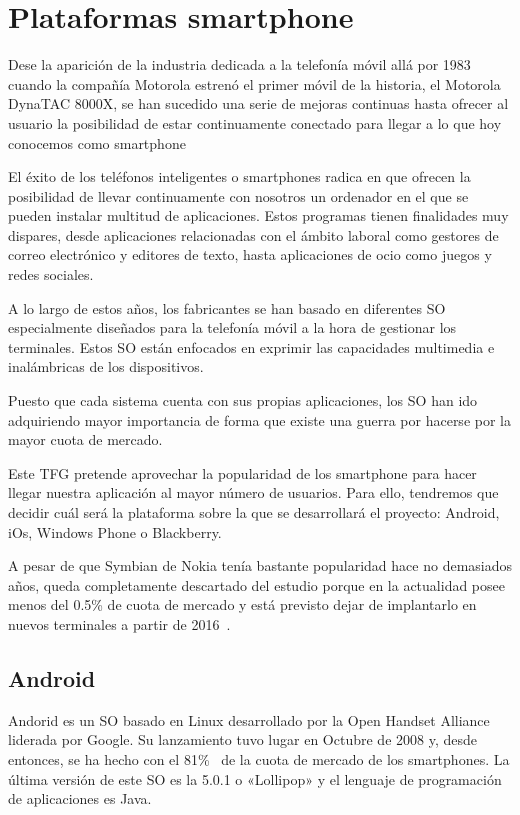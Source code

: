 \section{Plataformas smartphone}

Dese la aparición de la industria dedicada a la telefonía móvil allá por 1983 cuando la compañía
Motorola estrenó el primer móvil de la historia, el Motorola DynaTAC 8000X, se han sucedido una
serie de mejoras continuas hasta ofrecer al usuario la posibilidad de estar continuamente conectado
para llegar a lo que hoy conocemos como smartphone

El éxito de los teléfonos inteligentes o smartphones radica en que ofrecen la posibilidad de llevar
continuamente con nosotros un ordenador en el que se pueden instalar multitud de aplicaciones. Estos
programas tienen finalidades muy dispares, desde aplicaciones relacionadas con el ámbito laboral
como gestores de correo electrónico y editores de texto, hasta aplicaciones de ocio como juegos y
redes sociales.

A lo largo de estos años, los fabricantes se han basado en diferentes \acf{SO} especialmente
diseñados para la telefonía móvil a la hora de gestionar los terminales. Estos \acs{SO} están
enfocados en exprimir las capacidades multimedia e inalámbricas de los dispositivos.

Puesto que cada sistema cuenta con sus propias aplicaciones, los \acs{SO} han ido adquiriendo mayor
importancia de forma que existe una guerra por hacerse por la mayor cuota de mercado.

Este \acs{TFG} pretende aprovechar la popularidad de los smartphone para hacer llegar nuestra
aplicación al mayor número de usuarios. Para ello, tendremos que decidir cuál será la plataforma
sobre la que se desarrollará el proyecto: Android, iOs, Windows Phone o Blackberry.

A pesar de que Symbian de Nokia tenía bastante popularidad hace no demasiados años, queda
completamente descartado del estudio porque en la actualidad posee menos del 0.5\% de cuota de
mercado y está previsto dejar de implantarlo en nuevos terminales a partir de
2016~\cite{Litchfield13}.

\subsection{Android}

Andorid es un \acs{SO} basado en Linux desarrollado por la Open Handset Alliance liderada por
Google. Su lanzamiento tuvo lugar en Octubre de 2008 y, desde entonces, se ha hecho con el
81\%~\cite{Llamas13} de la cuota de mercado de los smartphones. La última versión de este \acs{SO}
 es la 5.0.1 o «Lollipop» y el lenguaje de programación de aplicaciones es Java.

